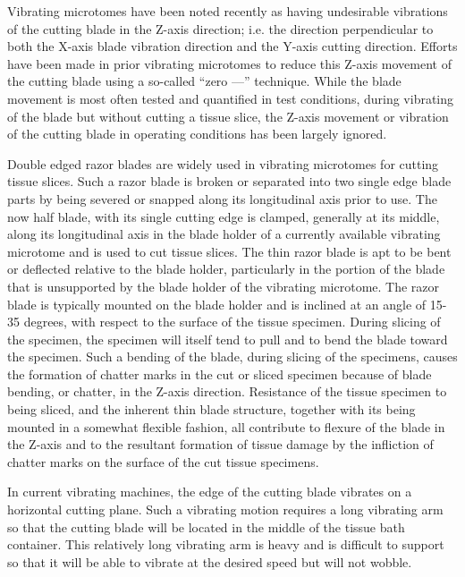 \documentclass{article}
\begin{document}
Vibrating microtomes have been noted recently as having undesirable vibrations of the cutting blade in the Z-axis direction; i.e. the direction perpendicular to both the X-axis blade vibration direction and the Y-axis cutting direction. Efforts have been made in prior vibrating microtomes to reduce this Z-axis movement of the cutting blade using a so-called ``zero —'' technique. While the blade movement is most often tested and quantified in test conditions, during vibrating of the blade but without cutting a tissue slice, the Z-axis movement or vibration of the cutting blade in operating conditions has been largely ignored.

Double edged razor blades are widely used in vibrating microtomes for cutting tissue slices. Such a razor blade is broken or separated into two single edge blade parts by being severed or snapped along its longitudinal axis prior to use. The now half blade, with its single cutting edge is clamped, generally at its middle, along its longitudinal axis in the blade holder of a currently available vibrating microtome and is used to cut tissue slices. The thin razor blade is apt to be bent or deflected relative to the blade holder, particularly in the portion of the blade that is unsupported by the blade holder of the vibrating microtome. The razor blade is typically mounted on the blade holder and is inclined at an angle of 15-35 degrees, with respect to the surface of the tissue specimen. During slicing of the specimen, the specimen will itself tend to pull and to bend the blade toward the specimen. Such a bending of the blade, during slicing of the specimens, causes the formation of chatter marks in the cut or sliced specimen because of blade bending, or chatter, in the Z-axis direction. Resistance of the tissue specimen to being sliced, and the inherent thin blade structure, together with its being mounted in a somewhat flexible fashion, all contribute to flexure of the blade in the Z-axis and to the resultant formation of tissue damage by the infliction of chatter marks on the surface of the cut tissue specimens.

In current vibrating machines, the edge of the cutting blade vibrates on a horizontal cutting plane. Such a vibrating motion requires a long vibrating arm so that the cutting blade will be located in the middle of the tissue bath container. This relatively long vibrating arm is heavy and is difficult to support so that it will be able to vibrate at the desired speed but will not wobble.
\end{document}
